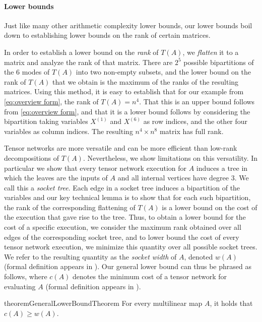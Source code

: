 \documentclass{toc}
\begin{document}
\paragraph*{Lower bounds}

Just like many other arithmetic complexity lower bounds, our lower bounds
boil down to establishing lower bounds on the rank of certain
matrices.

In order to establish a lower bound on the \emph{rank} of $T(A)$,
we \emph{flatten} it to a matrix and analyze the rank of that
matrix.  There are $2^5$ possible bipartitions of the $6$ modes of
$T(A)$ into two non-empty subsets, and the lower bound on the rank of
$T(A)$ that we obtain is the maximum of the ranks of the
resulting matrices.  Using this method, it is easy to establish that
for our example from \eqref{eq:overview form}, the rank of
$T(A) = n^4$.  That this is an upper bound follows from
\eqref{eq:overview form}, and that it is a lower bound follows by
considering the bipartition taking variables $X^{(1)}$ and
$X^{(6)}$ as row indices, and the other four variables as column indices.
The resulting $n^4 \times n^8$ matrix has full rank.

Tensor networks are more versatile and can be more efficient
than low-rank decompositions of $T(A)$.  Nevertheless, we show
limitations on this versatility.  In particular we show that every
tensor network execution for $A$ induces a tree in which the leaves are the inputs of $A$ and all internal vertices have degree $3$.  We call this a \emph{socket tree}.  Each edge in a socket
tree induces a bipartition of the variables and our key technical
lemma is to show that for each such bipartition, the rank of the
corresponding flattening of $T(A)$ is a lower bound on the
cost of the execution that gave rise to the tree.  Thus, to obtain a lower
bound for the cost of a specific execution, we consider the maximum
rank obtained over all
edges of the corresponding socket tree, and to lower bound the cost of
every tensor network execution, we minimize this quantity over all
possible socket trees.  We refer to the resulting quantity as the
\emph{socket width} of $A$, denoted $w(A)$ (formal definition appears in ).  Our general lower bound
can thus be phrased as follows, where $c(A)$ denotes the minimum cost of a tensor network for evaluating $A$ (formal definition appears in ).

\begin{restatable}{theorem}{GeneralLowerBoundTheorem}
  \label{thm:general lower bound}
  For every multilinear map $A$, it holds that $c(A) \ge w(A)$.
\end{restatable}
\end{document}

